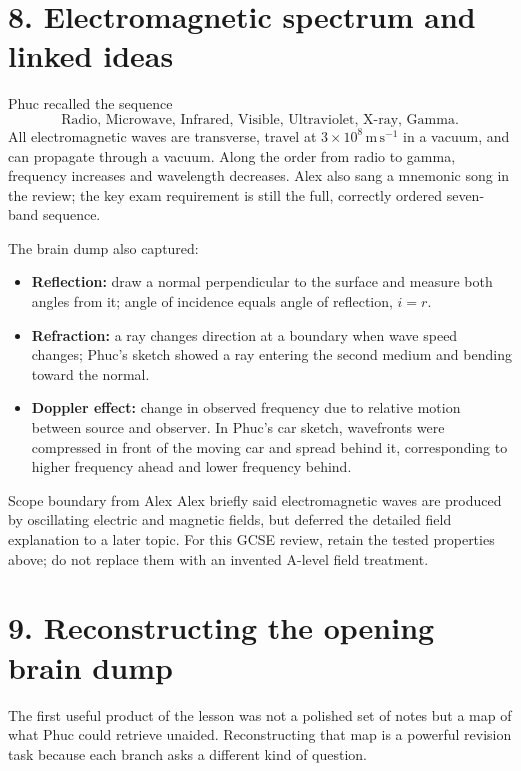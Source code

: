 \documentclass[11pt,a4paper]{article}
\begin{document}
\section*{8. Electromagnetic spectrum and linked ideas}
Phuc recalled the sequence
\[
\boxed{\text{Radio, Microwave, Infrared, Visible, Ultraviolet, X-ray, Gamma}}.
\]
All electromagnetic waves are transverse, travel at $3\times10^8\,\mathrm{m\,s^{-1}}$ in a vacuum, and can propagate through a vacuum. Along the order from radio to gamma, frequency increases and wavelength decreases. Alex also sang a mnemonic song in the review; the key exam requirement is still the full, correctly ordered seven-band sequence.

The brain dump also captured:
\begin{itemize}
\item \textbf{Reflection:} draw a normal perpendicular to the surface and measure both angles from it; angle of incidence equals angle of reflection, $i=r$.
\item \textbf{Refraction:} a ray changes direction at a boundary when wave speed changes; Phuc's sketch showed a ray entering the second medium and bending toward the normal.
\item \textbf{Doppler effect:} change in observed frequency due to relative motion between source and observer. In Phuc's car sketch, wavefronts were compressed in front of the moving car and spread behind it, corresponding to higher frequency ahead and lower frequency behind.
\end{itemize}

\begin{keybox}{Scope boundary from Alex}
Alex briefly said electromagnetic waves are produced by oscillating electric and magnetic fields, but deferred the detailed field explanation to a later topic. For this GCSE review, retain the tested properties above; do not replace them with an invented A-level field treatment.
\end{keybox}

\section*{9. Reconstructing the opening brain dump}
The first useful product of the lesson was not a polished set of notes but a map of what Phuc could retrieve unaided. Reconstructing that map is a powerful revision task because each branch asks a different kind of question.
\end{document}
